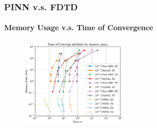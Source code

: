 \begin{frame}
  \frametitle{PINN v.s. FDTD}
  \framesubtitle{Memory Usage v.s. Time of Convergence}

  
  \begin{figure}[htbp]
    \centering
    \includegraphics[width=0.45\textwidth]{figure/FIG_Benchmark_Time_Tol.pdf}
    \caption{
    }
    \label{FIG:Benchmark:TimeTol}
  \end{figure}
\end{frame}

